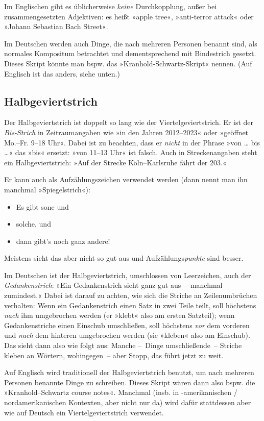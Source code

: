 Im Englischen gibt es üblicherweise \emph{keine} Durchkopplung, außer
bei zusammengesetzten Adjektiven: es heißt »apple tree«, »anti-terror
attack« oder »Johann Sebastian Bach Street«.

Im Deutschen werden auch Dinge, die nach mehreren Personen benannt
sind, als normales Kompositum betrachtet und dementsprechend mit
Bindestrich gesetzt.  Dieses Skript könnte man bspw. das
»Kranhold-Schwartz-Skript« nennen.  (Auf Englisch ist das anders,
siehe unten.)

\subsection{Halbgeviertstrich}
\label{subsec:halbgeviert}
Der Halbgeviertstrich \Char{--} ist doppelt so lang wie der
Viertelgeviertstrich.  Er ist der \emph{Bis-Strich} in Zeitraumangaben
wie »in den Jahren 2012--2023« oder »geöffnet Mo.--Fr. 9--18 Uhr«.
Dabei ist zu beachten, dass er \emph{nicht} in der Phrase »von … bis
…« das »bis« ersetzt: »von 11--13 Uhr« ist falsch.  Auch in
Streckenangaben steht ein Halbgeviertstrich: »Auf der Strecke
Köln--Karlsruhe fährt der  203.«

Er kann auch als Aufzählungszeichen verwendet werden (dann nennt man
ihn manchmal »Spiegelstrich«):
 \begin{itemize}[label=--]
 \item Es gibt sone und
 \item solche, und
 \item dann gibt's noch ganz andere!
 \end{itemize}
 Meistens sieht das aber nicht so gut aus und Aufzählungs\emph{punkte}
 \Char{\textbullet} sind besser.

Im Deutschen ist der Halbgeviertstrich, umschlossen von Leerzeichen,
auch der \emph{Gedankenstrich}: »Ein Gedankenstrich sieht ganz gut
aus~-- manchmal zumindest.«  Dabei ist darauf zu achten, wie sich die
Striche an Zeilenumbrüchen verhalten: Wenn ein Gedankenstrich einen
Satz in zwei Teile teilt, soll höchstens \emph{nach} ihm umgebrochen
werden (er »klebt« also am ersten Satzteil); wenn Gedankenstriche
einen Einschub umschließen, soll höchstens \emph{vor} dem vorderen und
\emph{nach} dem hinteren umgebrochen werden (sie »kleben« also am
Einschub).  Das sieht dann also wie folgt aus:  Manche --~Dinge
umschließende~-- Striche kleben an Wörtern, wohingegen~--
aber Stopp, das führt jetzt zu weit.

Auf Englisch wird traditionell der Halbgeviertstrich benutzt, um nach
mehreren Personen benannte Dinge zu schreiben.  Dieses Skript wären
dann also bspw. die »\foreignlanguage{british}{Kranhold--Schwartz
  course notes}«.  Manchmal (insb. in -amerikanischen /
nordamerikanischen Kontexten, aber nicht nur da) wird dafür
stattdessen aber wie auf Deutsch ein Viertelgeviertstrich verwendet.

